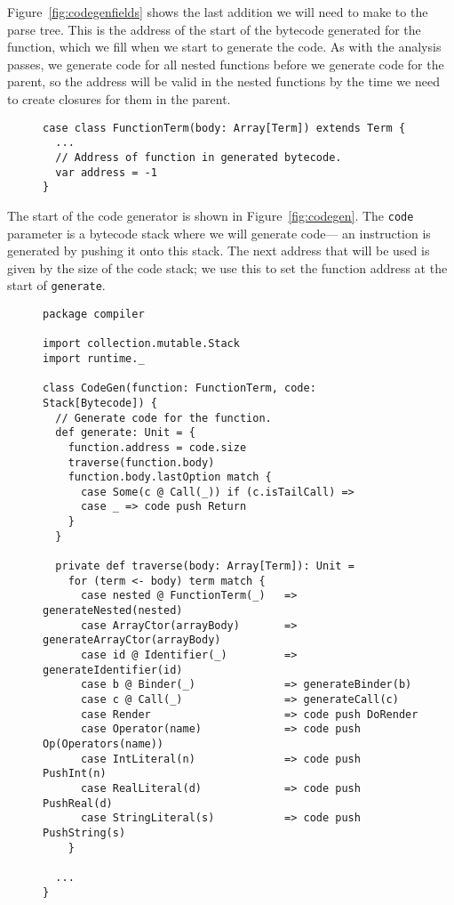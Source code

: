 Figure~\ref{fig:codegenfields} shows
the last addition we will need to make to the parse tree.
This is the address of the start of the bytecode generated for the function,
which we fill when we start to generate the code.
As with the analysis passes,
we generate code for all nested functions
before we generate code for the parent,
so the address will be valid in the nested functions
by the time we need to create closures for them in the parent.

\begin{figure}
\begin{verbatim}
case class FunctionTerm(body: Array[Term]) extends Term {
  ...
  // Address of function in generated bytecode.
  var address = -1
}
\end{verbatim}
\getcaption
\end{figure}

The start of the code generator is shown in Figure~\ref{fig:codegen}.
The \verb!code! parameter is a bytecode stack where we will generate code---%
an instruction is generated by pushing it onto this stack.
The next address that will be used is given by the size of the code stack;
we use this to set the function address at the start of \verb!generate!.

\begin{figure}
\begin{verbatim}
package compiler

import collection.mutable.Stack
import runtime._

class CodeGen(function: FunctionTerm, code: Stack[Bytecode]) {
  // Generate code for the function.
  def generate: Unit = {
    function.address = code.size
    traverse(function.body)
    function.body.lastOption match {
      case Some(c @ Call(_)) if (c.isTailCall) =>
      case _ => code push Return
    }
  }

  private def traverse(body: Array[Term]): Unit =
    for (term <- body) term match {
      case nested @ FunctionTerm(_)   => generateNested(nested)
      case ArrayCtor(arrayBody)       => generateArrayCtor(arrayBody)
      case id @ Identifier(_)         => generateIdentifier(id)
      case b @ Binder(_)              => generateBinder(b)
      case c @ Call(_)                => generateCall(c)
      case Render                     => code push DoRender
      case Operator(name)             => code push Op(Operators(name))
      case IntLiteral(n)              => code push PushInt(n)
      case RealLiteral(d)             => code push PushReal(d)
      case StringLiteral(s)           => code push PushString(s)
    }

  ...
}
\end{verbatim}
\getcaption
\end{figure}

